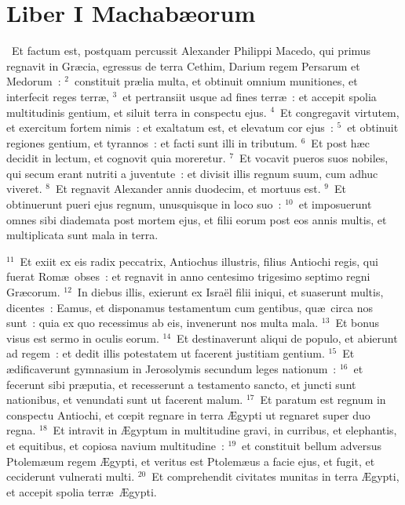 \clearpage
{\centering \section*{Liber I Machabæorum}}\thispagestyle{empty}

~Et factum est, postquam percussit Alexander Philippi Macedo, qui primus regnavit in Gr\ae cia, egressus de terra Cethim, Darium regem Persarum et Medorum~:
${}^{2}$~constituit pr\ae lia multa, et obtinuit omnium munitiones, et interfecit reges terr\ae ,
${}^{3}$~et pertransiit usque ad fines terr\ae~: et accepit spolia multitudinis gentium, et siluit terra in conspectu ejus.
${}^{4}$~Et congregavit virtutem, et exercitum fortem nimis~: et exaltatum est, et elevatum cor ejus~:
${}^{5}$~et obtinuit regiones gentium, et tyrannos~: et facti sunt illi in tributum.
${}^{6}$~Et post h\ae c decidit in lectum, et cognovit quia moreretur.
${}^{7}$~Et vocavit pueros suos nobiles, qui secum erant nutriti a juventute~: et divisit illis regnum suum, cum adhuc viveret.
${}^{8}$~Et regnavit Alexander annis duodecim, et mortuus est.
${}^{9}$~Et obtinuerunt pueri ejus regnum, unusquisque in loco suo~:
${}^{10}$~et imposuerunt omnes sibi diademata post mortem ejus, et filii eorum post eos annis multis, et multiplicata sunt mala in terra.


${}^{11}$~Et exiit ex eis radix peccatrix, Antiochus illustris, filius Antiochi regis, qui fuerat Rom\ae\ obses~: et regnavit in anno centesimo trigesimo septimo regni Gr\ae corum.
${}^{12}$~In diebus illis, exierunt ex Isra\"el filii iniqui, et suaserunt multis, dicentes~: Eamus, et disponamus testamentum cum gentibus, qu\ae\ circa nos sunt~: quia ex quo recessimus ab eis, invenerunt nos multa mala.
${}^{13}$~Et bonus visus est sermo in oculis eorum.
${}^{14}$~Et destinaverunt aliqui de populo, et abierunt ad regem~: et dedit illis potestatem ut facerent justitiam gentium.
${}^{15}$~Et \ae dificaverunt gymnasium in Jerosolymis secundum leges nationum~:
${}^{16}$~et fecerunt sibi pr\ae putia, et recesserunt a testamento sancto, et juncti sunt nationibus, et venundati sunt ut facerent malum.
${}^{17}$~Et paratum est regnum in conspectu Antiochi, et cœpit regnare in terra \AE gypti ut regnaret super duo regna.
${}^{18}$~Et intravit in \AE gyptum in multitudine gravi, in curribus, et elephantis, et equitibus, et copiosa navium multitudine~:
${}^{19}$~et constituit bellum adversus Ptolem\ae um regem \AE gypti, et veritus est Ptolem\ae us a facie ejus, et fugit, et ceciderunt vulnerati multi.
${}^{20}$~Et comprehendit civitates munitas in terra \AE gypti, et accepit spolia terr\ae\ \AE gypti.


